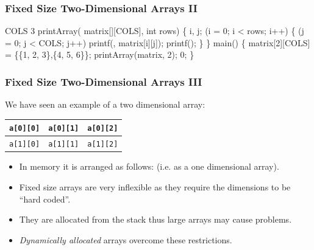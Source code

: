 \documentclass[smaller,table]{beamer}
\begin{document}
\begin{frame}[fragile]
\frametitle{Fixed Size Two-Dimensional Arrays II}
\vspace{-0.2in}
\begin{semiverbatim}
\footnotesize
\kr\kl{} 
\kl{} COLS 3
\kl
\kl{} printArray( matrix[][COLS], int rows)
\kl\{
\kl   {} i, j;
\kl   {} (i = 0; i < rows; i++)
\kl   \{
\kl      {} (j = 0; j < COLS; j++)
\kl         printf(, matrix[i][j]);    
\kl      printf();
\kl   \}
\kl\}
\kl
\kl{} main()
\kl\{
\kl   {} matrix[2][COLS] = \{\{1, 2, 3\},\{4, 5, 6\}\};
\kl   printArray(matrix, 2);
\kl   {} 0;
\kl\}
\end{semiverbatim}
\end{frame}

\begin{frame}
\frametitle{Fixed Size Two-Dimensional Arrays III}
We have seen an example of a two dimensional array:
\begin{center}
\begin{tabular}{|c|c|c|}
\hline
\tt a[0][0]&\tt a[0][1]&\tt a[0][2]\\
\hline
\tt a[1][0]&\tt a[1][1]&\tt a[1][2]\\
\hline
\end{tabular}
\end{center}
\begin{itemize}
\item In memory it is arranged as follows:
(i.e. as a one dimensional array).
\item Fixed size arrays are very inflexible as they require the dimensions to be ``hard coded''.
\item They are allocated from the stack thus large arrays may cause problems.
\item \emph{Dynamically allocated} arrays overcome these restrictions.
\end{itemize}
\end{frame}
\end{document}
